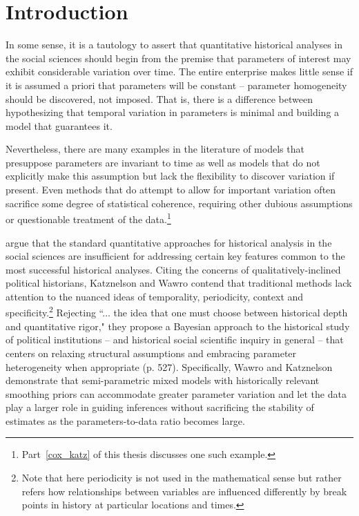 \chapter{Introduction}
\label{introduction}

In some sense, it is a tautology to assert that quantitative historical analyses in the social sciences should begin from the premise that parameters of interest may exhibit considerable variation over time. The entire enterprise makes little sense if it is assumed a priori that parameters will be constant -- parameter homogeneity should be discovered, not imposed. That is, there is a difference between hypothesizing that temporal variation in parameters is minimal and building a model that guarantees it. 

Nevertheless, there are many examples in the literature of models that presuppose parameters are invariant to time as well as models that do not explicitly make this assumption but lack the flexibility to discover variation if present.  Even methods that do attempt to allow for important variation often sacrifice some degree of statistical coherence, requiring other dubious assumptions or questionable treatment of the data.\footnote{Part~\ref{cox_katz} of this thesis discusses one such example.}

 argue that the standard quantitative approaches for historical analysis in the social sciences are insufficient for addressing certain key features common to the most successful historical analyses. Citing the concerns of qualitatively-inclined political historians, Katznelson and Wawro contend that traditional methods lack attention to the nuanced ideas of temporality, periodicity, context and specificity.\footnote{Note that here periodicity is not used in the mathematical sense but rather refers how relationships between variables are influenced differently by break points in history at particular locations and times.}  Rejecting ``... the idea that one must choose between historical depth and quantitative rigor," they propose a Bayesian approach to the historical study of political institutions -- and historical social scientific inquiry in general --  that centers on relaxing structural assumptions and embracing  parameter heterogeneity when appropriate (p. 527). Specifically, Wawro and Katznelson demonstrate that semi-parametric mixed models with historically relevant smoothing priors can accommodate greater parameter variation and let the data play a larger role in guiding inferences without sacrificing the stability of estimates as the parameters-to-data ratio becomes large.  


